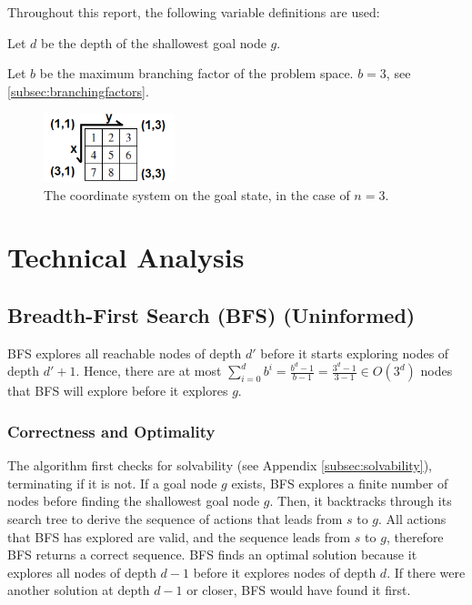 \documentclass[runningheads]{llncs}
\begin{document}
Throughout this report, the following variable definitions are used:

Let $d$ be the depth of the shallowest goal node $g$.

Let $b$ be the maximum branching factor of the problem space. $b = 3$, see \ref{subsec:branchingfactors}.

\begin{figure}
	\centering
	\includegraphics[height=2cm]{coord_system.png}
	\caption{The coordinate system on the goal state, in the case of $n=3$.} \label{fig:coordsystem}
\end{figure}



\section{Technical Analysis}

\subsection{Breadth-First Search (BFS) (Uninformed)}

BFS explores all reachable nodes of depth $d'$ before it starts exploring nodes of depth $d'+1$. Hence, there are at most $\sum_{i=0}^d b^i = \frac{b^d-1}{b-1} = \frac{3^d-1}{3-1} \in O(3^d)$ nodes that BFS will explore before it explores $g$.

\subsubsection{Correctness and Optimality}
The algorithm first checks for solvability (see Appendix \ref{subsec:solvability}), terminating if it is not. If a goal node $g$ exists, BFS explores a finite number of nodes before finding the shallowest goal node $g$. Then, it backtracks through its search tree to derive the sequence of actions that leads from $s$ to $g$. All actions that BFS has explored are valid, and the sequence leads from $s$ to $g$, therefore BFS returns a correct sequence.
BFS finds an optimal solution because it explores all nodes of depth $d-1$ before it explores nodes of depth $d$. If there were another solution at depth $d-1$ or closer, BFS would have found it first.
\end{document}
